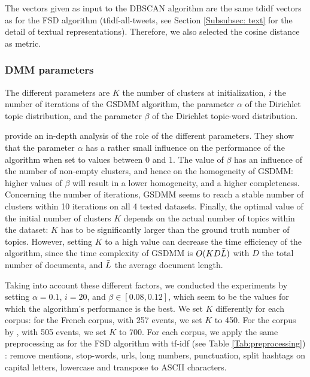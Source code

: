 The vectors given as input to the DBSCAN algorithm are the same tdidf vectors as for the FSD algorithm (tfidf-all-tweets, see Section \ref{Subsubsec: text} for the detail of textual representations). Therefore, we also selected the cosine distance as metric.

\subsubsection{DMM parameters}
 The different parameters are $K$ the number of clusters at initialization, $i$ the number of iterations of the GSDMM algorithm, the parameter $\alpha$ of the Dirichlet topic distribution, and the parameter $\beta$ of the Dirichlet topic-word distribution.

\citet{yin_dirichlet_2014} provide an in-depth analysis of the role of the different parameters. They show that the parameter $\alpha$ has a rather small influence on the performance of the algorithm when set to values between 0 and 1. The value of $\beta$ has an influence of the number of non-empty clusters, and hence on the homogeneity of GSDMM: higher values of $\beta$ will result in a lower homogeneity, and a higher completeness. Concerning the number of iterations, GSDMM seems to reach a stable number of clusters within 10 iterations on all 4 tested datasets. Finally, the optimal value of the initial number of clusters $K$ depends on the actual number of topics within the dataset: $K$ has to be significantly larger than the ground truth number of topics. However, setting $K$ to a high value can decrease the time efficiency of the algorithm, since the time complexity of GSDMM is $O(KD\Bar{L})$ with $D$ the total number of documents, and $\Bar{L}$ the average document length.

Taking into account these different factors, we conducted the experiments by setting $\alpha=0.1$, $i=20$, and $\beta \in [0.08, 0.12]$, which seem to be the values for which the algorithm's performance is the best. We set $K$ differently for each corpus: for the French corpus, with 257 events, we set $K$ to 450. For the corpus by \citet{mcminn_building_2013}, with 505 events, we set $K$ to 700. For each corpus, we apply the same preprocessing as for the FSD algorithm with tf-idf (see Table \ref{Tab:preprocessing}) : remove mentions, stop-words, urls, long numbers, punctuation, split hashtags on capital letters, lowercase and transpose to ASCII characters.

